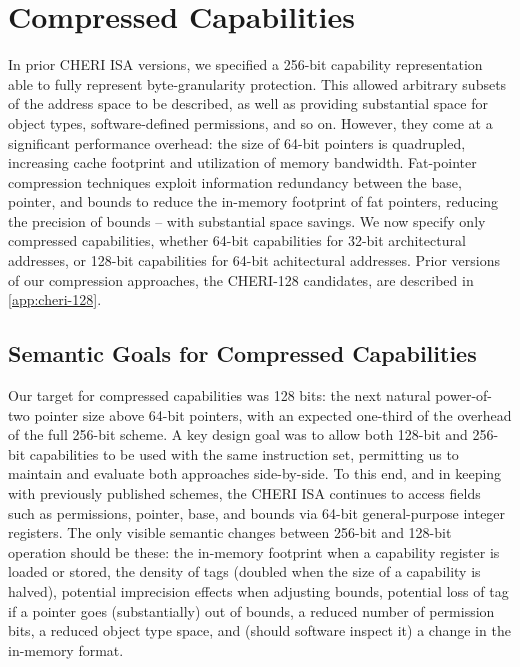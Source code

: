 \section{Compressed Capabilities}
\label{sec:rational:comressed}
In prior CHERI ISA versions, we specified a 256-bit capability
representation able to fully represent byte-granularity protection.
This allowed arbitrary subsets of the address space to be described, as well as
providing substantial
space for object types, software-defined permissions, and so on.
However, they come at a significant performance overhead: the size of 64-bit
pointers is quadrupled, increasing cache footprint and utilization of memory
bandwidth.
Fat-pointer compression techniques exploit information redundancy between the
base, pointer, and bounds to reduce the in-memory footprint of fat pointers,
reducing the precision of bounds -- with substantial space savings.
We now specify only compressed capabilities, whether 64-bit capabilities for
32-bit architectural addresses, or 128-bit capabilities for 64-bit
achitectural addresses.
Prior versions of our compression approaches, the CHERI-128 candidates, are
described in \cref{app:cheri-128}.

\subsection{Semantic Goals for Compressed Capabilities}

Our target for compressed capabilities was 128 bits: the next natural
power-of-two pointer size above 64-bit pointers, with an expected one-third of
the overhead of the full 256-bit scheme.
A key design goal was to allow both 128-bit and 256-bit capabilities to be
used with the same instruction set, permitting us to maintain and evaluate
both approaches side-by-side.
To this end, and in keeping with previously published schemes, the CHERI ISA
continues to access fields such as permissions, pointer, base, and bounds via
64-bit general-purpose integer registers.
The only visible semantic changes between 256-bit and 128-bit operation should
be these:
the in-memory footprint when a capability register is loaded or stored,
the density of tags (doubled when the size of a capability is halved),
potential imprecision effects when adjusting bounds, potential loss of tag if
a pointer goes (substantially) out of bounds, a reduced number of permission
bits, a reduced object type space, and (should software inspect it) a change
in the in-memory format.

